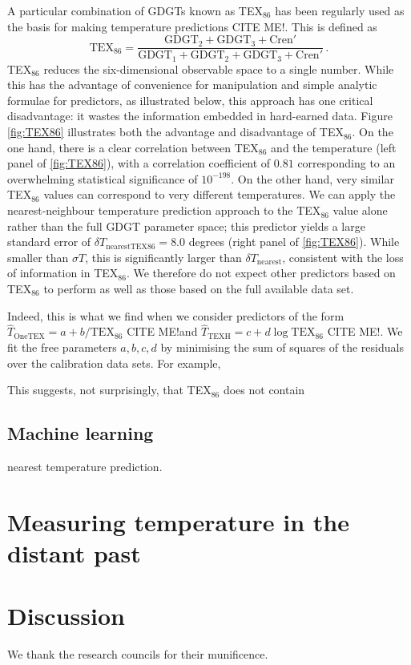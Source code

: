 \documentclass[rmp,aps,twocolumn]{revtex4-1}
\newcommand{\citeme}{{\color{blue} CITE ME!}}
\def\be{\begin{equation}}
\def\ee{\end{equation}}
\begin{document}
A particular combination of GDGTs known as TEX$_{86}$ has been regularly used as the basis for making temperature predictions \citeme.  This is defined as 
\be\label{eq:TEX86}
\mathrm{TEX}_{86} = \frac{\mathrm{GDGT}_2+\mathrm{GDGT}_3+\mathrm{Cren}'}{\mathrm{GDGT}_1+\mathrm{GDGT}_2+\mathrm{GDGT}_3+\mathrm{Cren}'}\, .
\ee
TEX$_{86}$ reduces the six-dimensional observable space to a single number.  While this has the advantage of convenience for manipulation and simple analytic formulae for predictors, as illustrated below, this approach has one critical disadvantage: it wastes the information embedded in hard-earned data.  Figure \ref{fig:TEX86} illustrates both the advantage and disadvantage of TEX$_{86}$.  On the one hand, there is a clear correlation between TEX$_{86}$ and the temperature (left panel of \autoref{fig:TEX86}), with a correlation coefficient of $0.81$ corresponding to an overwhelming statistical significance of $10^{-198}$.  On the other hand, very similar TEX$_{86}$ values can correspond to very different temperatures.  We can apply the nearest-neighbour temperature prediction approach to the TEX$_{86}$ value alone rather than the full GDGT parameter space; this predictor yields a large standard error of $\delta T_\mathrm{nearest TEX86} = 8.0$ degrees (right panel of \autoref{fig:TEX86}).  While smaller than $\sigma T$, this is significantly larger than $\delta T_\mathrm{nearest}$, consistent with the loss of information in TEX$_{86}$.  We therefore do not expect other predictors based on TEX$_{86}$ to perform as well as those based on the full available data set.

Indeed, this is what we find when we consider predictors of the form $\hat{T}_\mathrm{OneTEX}  = a + b / \mathrm{TEX}_{86}$ \citeme and $\hat{T}_\mathrm{TEXH}  = c + d \log \mathrm{TEX}_{86}$ \citeme.  We fit the free parameters $a, b, c, d$ by minimising the sum of squares of the residuals over the calibration data sets.  For example,


This suggests, not surprisingly, that TEX$_{86}$ does not contain 




\subsection{Machine learning}

nearest temperature prediction.  


\section{Measuring temperature in the distant past}

\section{Discussion}\label{sec:discussion}

\begin{acknowledgements}
We thank the research councils for their munificence.

\end{acknowledgements}



\end{document}
